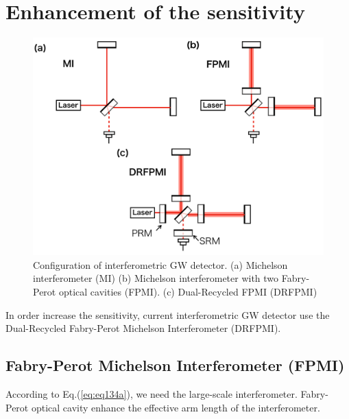 \section{Enhancement of the sensitivity} \label{sec:13}
\begin{figure}[h]
  \begin{center}   
    \includegraphics[width=14cm]{./img_chap1/img133.png}
    \caption{Configuration of interferometric GW detector. (a) Michelson interferometer (MI) (b) Michelson interferometer with two Fabry-Perot optical cavities (FPMI). (c) Dual-Recycled FPMI (DRFPMI)} \label{img:img133}
  \end{center}
\end{figure}
In order increase the sensitivity, current interferometric GW detector use the Dual-Recycled Fabry-Perot Michelson Interferometer (DRFPMI). 


\subsection{Fabry-Perot Michelson Interferometer (FPMI)}
According to Eq.(\ref{eq:eq134a}), we need the large-scale interferometer. Fabry-Perot optical cavity enhance the effective arm length of the interferometer.

